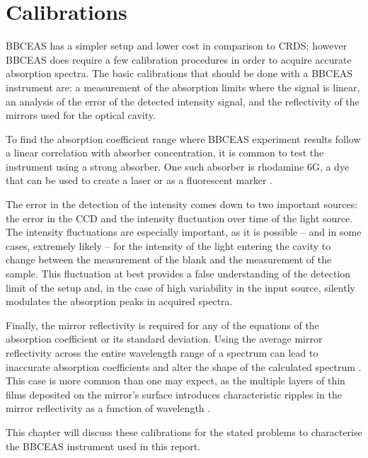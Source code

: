 \chapter{Calibrations}\label{ch:cal}

\acl{BBCEAS} has a simpler setup and lower cost in comparison to \ac{CRDS};
however \ac{BBCEAS} does require a few calibration procedures in order to
acquire accurate absorption spectra. The basic calibrations that should be
done with a \ac{BBCEAS} instrument are: a measurement of the absorption limits
where the signal is linear, an analysis of the error of the detected intensity
signal, and the reflectivity of the mirrors used for the optical cavity.

To find the absorption coefficient range where \ac{BBCEAS} experiment results
follow a linear correlation with absorber concentration, it is common to test
the instrument using a strong absorber. One such absorber is rhodamine 6G,
a dye that can be used to create a laser \cite{Pappalardo:1970hi} or as a
fluorescent marker \cite{Gear:1974tf}.

The error in the detection of the intensity comes down to two important
sources: the error in the \ac{CCD} and the intensity fluctuation over time of
the light source. The intensity fluctuations are especially important, as it is
possible -- and in some cases, extremely likely -- for the intensity of the
light entering the cavity to change between the measurement of the blank and
the measurement of the sample. This fluctuation at best provides a false
understanding of the detection limit of the setup and, in the case of high
variability in the input source, silently modulates the absorption peaks in
acquired spectra.

Finally, the mirror reflectivity is required for any of the equations of the
absorption coefficient or its standard deviation. Using the average mirror
reflectivity across the entire wavelength range of a spectrum can lead to
inaccurate absorption coefficients and alter the shape of the calculated
spectrum \cite{Berden:2009wk}. This case is more common than one may expect,
as the multiple layers of thin films deposited on the mirror's surface
introduces characteristic ripples in the mirror reflectivity as a function of
wavelength \cite{Islam:2007ea}.

This chapter will discuss these calibrations for the stated problems to
characterise the \ac{BBCEAS} instrument used in this report.



